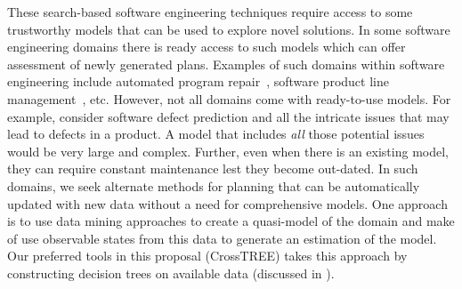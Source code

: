 These search-based software engineering techniques require access to some trustworthy models that can be used to explore novel solutions. In some software engineering domains there is ready access to such models which can offer assessment of newly generated plans. Examples of such domains within software engineering include automated program repair~\cite{Weimer2009, LeGoues2015}, software product line management~\cite{sayyad13, henard15}, etc. However, not all domains come with ready-to-use models. For example, consider software defect prediction and all the intricate issues that may lead to defects in a product. A model that includes {\em all} those potential issues would be very large and complex. Further, even when there is an existing model, they can require constant  maintenance lest they become out-dated. In such domains, we seek alternate methods for planning that can be automatically updated with new data without a need for comprehensive models. One approach is to use data mining approaches to create a quasi-model of the domain and make of use observable states from this data to generate an estimation of the model. Our preferred tools in this proposal (CrossTREE) takes this approach by constructing decision trees on available data (discussed in ). 